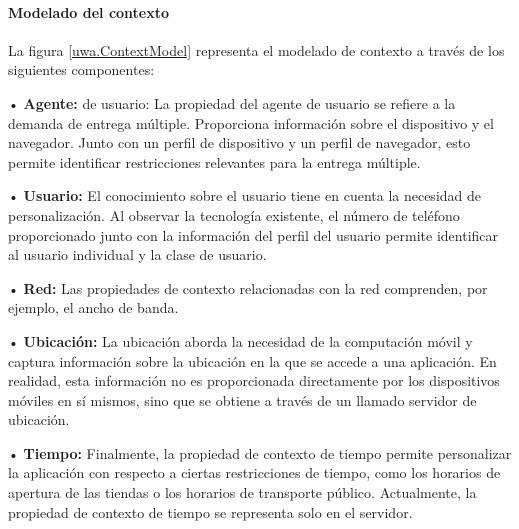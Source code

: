 \paragraph{Modelado del contexto}


La figura \ref{uwa.ContextModel} representa el modelado de contexto a través de los siguientes componentes: 

• \textbf{Agente:} de usuario: La propiedad del agente de usuario se refiere a la demanda de entrega múltiple. Proporciona información sobre el dispositivo y el navegador. Junto con un perfil de dispositivo y un perfil de navegador, esto permite identificar restricciones relevantes para la entrega múltiple.

• \textbf{Usuario:} El conocimiento sobre el usuario tiene en cuenta la necesidad de personalización. Al observar la tecnología existente, el número de teléfono proporcionado junto con la información del perfil del usuario permite identificar al usuario individual y la clase de usuario.

• \textbf{Red:} Las propiedades de contexto relacionadas con la red comprenden, por ejemplo, el ancho de banda.

• \textbf{Ubicación:} La ubicación aborda la necesidad de la computación móvil y captura información sobre la ubicación en la que se accede a una aplicación. En realidad, esta información no es proporcionada directamente por los dispositivos móviles en sí mismos, sino que se obtiene a través de un llamado servidor de ubicación.

• \textbf{Tiempo:} Finalmente, la propiedad de contexto de tiempo permite personalizar la aplicación con respecto a ciertas restricciones de tiempo, como los horarios de apertura de las tiendas o los horarios de transporte público. Actualmente, la propiedad de contexto de tiempo se representa solo en el servidor.

